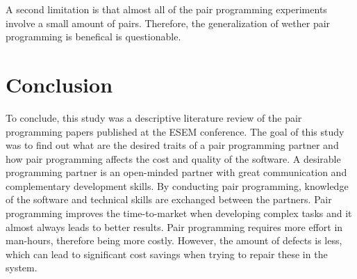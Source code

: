 \documentclass[conference]{IEEEtran}
\begin{document}
A second limitation is that almost all of the pair programming experiments involve a small amount of pairs. Therefore, the generalization of wether pair programming is benefical is questionable.

\section{Conclusion}

To conclude, this study was a descriptive literature review of the pair programming papers published at the ESEM conference. The goal of this study was to find out what are the desired traits of a pair programming partner and how pair programming affects the cost and quality of the software. A desirable programming partner is an open-minded partner with great communication and complementary development skills. By conducting pair programming, knowledge of the software and technical skills are exchanged between the partners. Pair programming improves the time-to-market when developing complex tasks and it almost always leads to better results. Pair programming requires more effort in man-hours, therefore being more costly. However, the amount of defects is less, which can lead to significant cost savings when trying to repair these in the system. 






\end{document}
